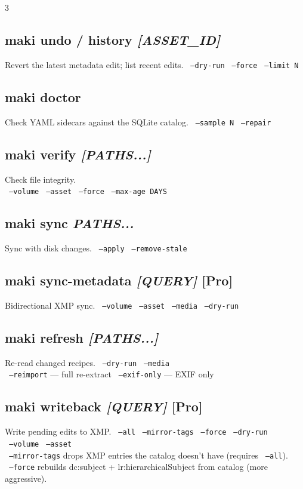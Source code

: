 \documentclass[a4paper,landscape,8pt]{article}
\newcommand{\opt}[1]{\texttt{\scriptsize\color{maki-stone} #1}}
\newcommand{\pro}{\textcolor{maki-teal}{\scriptsize [Pro]}}
\begin{document}
\begin{multicols}{3}
\subsection{maki undo / history \textit{[ASSET\_ID]}}
Revert the latest metadata edit; list recent edits. \opt{--dry-run} \opt{--force} \opt{--limit N}

\subsection{maki doctor}
Check YAML sidecars against the SQLite catalog. \opt{--sample N} \opt{--repair}

\subsection{maki verify \textit{[PATHS...]}}
Check file integrity. \\
\opt{--volume} \opt{--asset} \opt{--force} \opt{--max-age DAYS}

\subsection{maki sync \textit{PATHS...}}
Sync with disk changes. \opt{--apply} \opt{--remove-stale}

\subsection{maki sync-metadata \textit{[QUERY]} \pro}
Bidirectional XMP sync. \opt{--volume} \opt{--asset} \opt{--media} \opt{--dry-run}

\subsection{maki refresh \textit{[PATHS...]}}
Re-read changed recipes. \opt{--dry-run} \opt{--media} \\
\opt{--reimport} — full re-extract \opt{--exif-only} — EXIF only

\subsection{maki writeback \textit{[QUERY]} \pro}
Write pending edits to XMP. \opt{--all} \opt{--mirror-tags} \opt{--force} \opt{--dry-run} \\
\opt{--volume} \opt{--asset} \\
\opt{--mirror-tags} drops XMP entries the catalog doesn't have (requires \opt{--all}). \\
\opt{--force} rebuilds dc:subject + lr:hierarchicalSubject from catalog (more aggressive).


\end{multicols}
\end{document}

